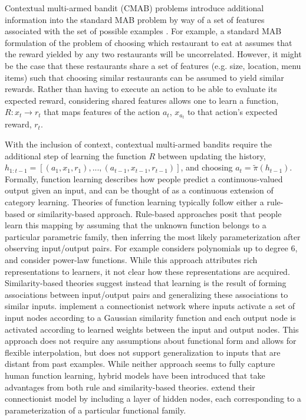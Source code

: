 \documentclass[10pt,letterpaper]{article}
\begin{document}
	Contextual multi-armed bandit (CMAB) problems introduce additional information into the standard MAB problem by way of a set of features associated with the set of possible examples \citep{Langford}. For example, a standard MAB formulation of the problem of choosing which restaurant to eat at assumes that the reward yielded by any two restaurants will be uncorrelated. However, it might be the case that these restaurants share a set of features (e.g. size, location, menu items) such that choosing similar restaurants can be assumed to yield similar rewards. Rather than having to execute an action to be able to evaluate its expected reward, considering shared features allows one to learn a function, $R: x_{t} \to r_{t}$ that maps features of the action $a_{t}$, $x_{a_{t}}$ to that action's expected reward, $r_{t}$.
	
	With the inclusion of context, contextual multi-armed bandits require the additional step of learning the function $R$ between updating the history, $h_{1:t-1} = [(a_{1}, x_{1}, r_{1}),...,(a_{t-1}, x_{t-1}, r_{t-1})]$, and choosing $a_{t} = \tilde{\pi}(h_{t-1})$. Formally, function learning describes how people predict a continuous-valued output given an input, and can be thought of as a continuous extension of category learning. Theories of function learning typically follow either a rule-based or similarity-based approach. Rule-based approaches posit that people learn this mapping by assuming that the unknown function belongs to a particular parametric family, then inferring the most likely parameterization after observing input/output pairs. For example \cite{Carroll} considers polynomials up to degree 6, and \cite{Koh} consider power-law functions. While this approach attributes rich representations to learners, it not clear how these representations are acquired. Similarity-based theories suggest instead that learning is the result of forming associations between input/output pairs and generalizing these associations to similar inputs. \cite{Busemeyer2005LearningFR} implement a connectionist network where inputs activate a set of input nodes according to a Gaussian similarity function and each output node is activated according to learned weights between the input and output nodes. This approach does not require any assumptions about functional form and allows for flexible interpolation, but does not support generalization to inputs that are distant from past examples. While neither approach seems to fully capture human function learning, hybrid models have been introduced that take advantages from both rule and similarity-based theories. \cite{McDaniel2005TheCB} extend their connectionist model by including a layer of hidden nodes, each corresponding to a parameterization of a particular functional family. 
	
\end{document}
